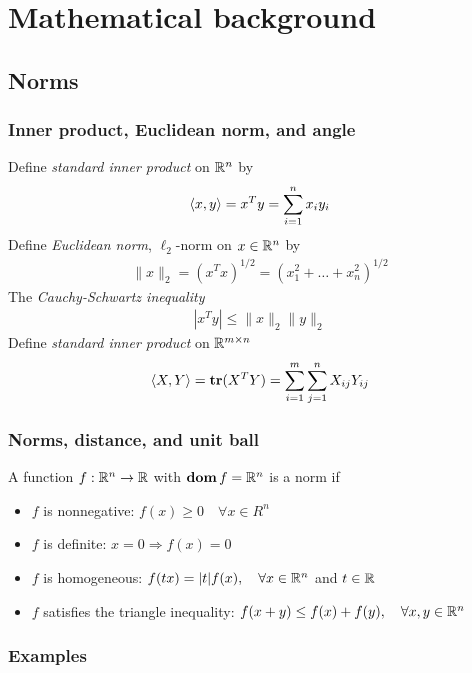 \chapter{Mathematical background}

\section{Norms}

\subsection{Inner product, Euclidean norm, and angle}
Define \textit{standard inner product} on $\mathbb{R}^n$ by
\begin{align*}
  \langle x,y\rangle=x^Ty=\sum_{i=1}^nx_iy_i
\end{align*}
Define \textit{Euclidean norm}, $\ell_2$-norm on $x\in\mathbb{R}^n$ by
\begin{align}
  \|x\|_2=(x^Tx)^{1/2}=(x_1^2+\dots+x_n^2)^{1/2}
\end{align}
The \textit{Cauchy-Schwartz inequality}
\begin{align*}
  |x^Ty|\le \|x\|_2\|y\|_2
\end{align*}
Define \textit{standard inner product} on $\mathbb{R}^{m\times n}$
\begin{align*}
  \langle X,Y\rangle=\mathop{\bf tr}(X^TY)=\sum_{i=1}^m\sum_{j=1}^nX_{ij}Y_{ij}
\end{align*}

\subsection{Norms, distance, and unit ball}
A function $f:\mathbb{R}^n\rightarrow\mathbb{R}$ with $\mathop{\bf dom} f=\mathbb{R}^n$ is a norm if
\begin{itemize}
  \item $f$ is nonnegative: $f(x)\ge 0\quad\forall x\in R^n$
  \item $f$ is definite: $x=0 \Rightarrow f(x)=0$
  \item $f$ is homogeneous: $f(tx)=|t|f(x),\quad\forall x\in\mathbb{R}^n$ and $t\in\mathbb{R}$
  \item $f$ satisfies the triangle inequality: $f(x+y)\le f(x)+f(y), \quad\forall x, y \in \mathbb{R}^n$
\end{itemize}

\subsection{Examples}

